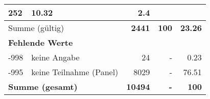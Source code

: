 \begin{longtable}{lXrrr}
       \num{252} &
       \num[round-mode=places,round-precision=2]{10,32} &
         \num[round-mode=places,round-precision=2]{2,4} \\
     \midrule
     \multicolumn{2}{l}{Summe (gültig)} &
       \textbf{\num{2441}} &
     \textbf{100} &
       \textbf{\num[round-mode=places,round-precision=2]{23,26}} \\
     \multicolumn{5}{l}{\textbf{Fehlende Werte}}\\
       -998 &
       keine Angabe &
         \num{24} &
        - &
         \num[round-mode=places,round-precision=2]{0,23} \\
       -995 &
       keine Teilnahme (Panel) &
         \num{8029} &
        - &
         \num[round-mode=places,round-precision=2]{76,51} \\
     \midrule
     \multicolumn{2}{l}{\textbf{Summe (gesamt)}} &
          \textbf{\num{10494}} &
        \textbf{-} &
        \textbf{100} \\
     \bottomrule
     \end{longtable}
     
